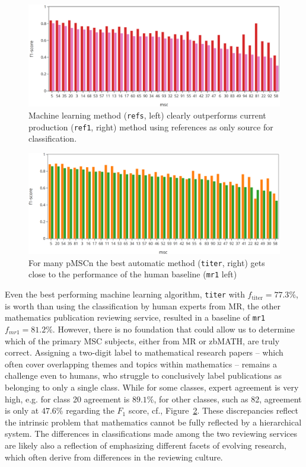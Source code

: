 \begin{figure}[t]
  \centering
  \includegraphics[width=1\textwidth]{ref1-refs.png}
  \caption{Machine learning method (\texttt{refs}, left)  clearly outperforms current production (\texttt{ref1}, right) method using references as only source for classification.}\label{fgRefs}
\end{figure}
\begin{figure}[t]
  \includegraphics[width=1\textwidth]{mr1-titer.png}
  \caption{For many pMSCn the best automatic method (\texttt{titer}, right) gets close to the performance of the human baseline (\texttt{mr1} left)}\label{fgHum}
\end{figure}
Even the best performing machine learning algorithm, \texttt{titer} with \(f_{\mathrm{titer}} = 77.3\%\), is worth than using the classification by human experts from MR, the other mathematics publication reviewing service, resulted in a baseline of \texttt{mr1} \(f_{mr1} = 81.2\%.\)
However, there is no foundation that could allow us to determine which of the primary MSC subjects, either from MR or zbMATH, are truly correct.
Assigning a two-digit label to mathematical research papers -- which often cover overlapping themes and topics within mathematics -- remains a challenge even to humans, who struggle to conclusively label publications as belonging to only a single class.
While for some classes, expert agreement is very high, e.g. for class 20 agreement is \(89.1\%\), for other classes, such as 82, agreement is only at \(47.6\%\) regarding the \(F_{1}\) score, cf., Figure~\ref{fgHum}.
These discrepancies reflect the intrinsic problem that mathematics cannot be fully reflected by a hierarchical system.
The differences in classifications made among the two reviewing services are likely also a reflection of emphasizing different facets of evolving research, which often derive from differences in the reviewing culture.


